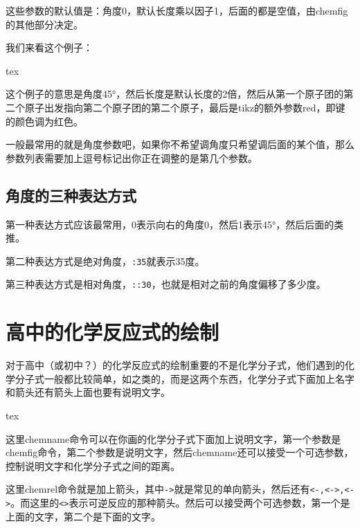 \documentclass[12pt,oneside]{book}
\begin{document}
\begin{common-format}
这些参数的默认值是：角度0，默认长度乘以因子1，后面的都是空值，由chemfig的其他部分决定。

我们来看这个例子：
\begin{tcbcode}[]{tex}
\end{tcbcode}


这个例子的意思是角度45\si{\degree}，然后长度是默认长度的2倍，然后从第一个原子团的第二个原子出发指向第二个原子团的第二个原子，最后是tikz的额外参数red，即键的颜色调为红色。

一般最常用的就是角度参数吧，如果你不希望调角度只希望调后面的某个值，那么参数列表需要加上逗号标记出你正在调整的是第几个参数。

\subsection{角度的三种表达方式}
第一种表达方式应该最常用，0表示向右的角度0，然后1表示45\si{\degree}，然后后面的类推。

第二种表达方式是绝对角度，\verb+:35+就表示35度。

第三种表达方式是相对角度，\verb+::30+，也就是相对之前的角度偏移了多少度。

\section{高中的化学反应式的绘制}
对于高中（或初中？）的化学反应式的绘制重要的不是化学分子式，他们遇到的化学分子式一般都比较简单，如之类的，而是这两个东西，化学分子式下面加上名字和箭头还有箭头上面也要有说明文字。

\begin{tcbcode}{tex}
\chemrel[电解][点燃]{<>}
\chemsign{+}
\end{tcbcode}

\chemrel[电解][点燃]{<>}
\chemsign{+}

这里chemname命令可以在你画的化学分子式下面加上说明文字，第一个参数是chemfig命令，第二个参数是说明文字，然后chemname还可以接受一个可选参数，控制说明文字和化学分子式之间的距离。

这里chemrel命令就是加上箭头，其中\verb+->+就是常见的单向箭头，然后还有\verb+<-,<->,<->+。而这里的\verb+<>+表示可逆反应的那种箭头。然后可以接受两个可选参数，第一个是上面的文字，第二个是下面的文字。


\end{common-format}
\end{document}
